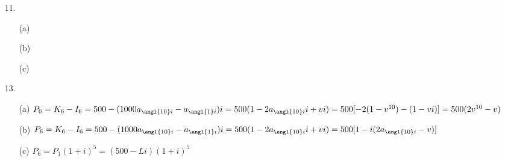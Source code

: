 \documentclass{article}
\begin{document}
\begin{itemize}
	\item [11.]
	      \begin{itemize}
		      \item [(a)]
		      \item [(b)]
		      \item [(c)]
	      \end{itemize}
	\item [13.]
	      \begin{itemize}
		      \item [(a)] $P_6=K_6-I_6=500-(1000a_{\angl{10}i}-a_{\angl{1}i})i=500(1-2a_{\angl{10}i}i+vi)=500[-2(1-v^{10})-(1-vi)]=500(2v^{10}-v)$
		      \item [(b)] $P_6=K_6-I_6=500-(1000a_{\angl{10}i}-a_{\angl{1}i})i=500(1-2a_{\angl{10}i}i+vi)=500[1-i(2a_{\angl{10}i}-v)]$
		      \item [(c)] $P_6=P_1(1+i)^5=(500-Li)(1+i)^5$
	      \end{itemize}
\end{itemize}
\end{document}
